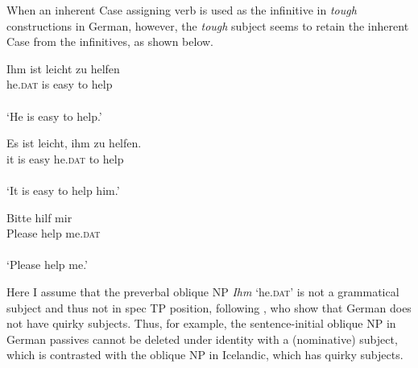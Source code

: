 \documentclass[output=paper,colorlinks,citecolor=brown,
]{langscibook}
\begin{document}
When an inherent Case assigning verb is used as the infinitive in \textit{tough} constructions in German, however, the \textit{tough} subject seems to retain the inherent Case from the infinitives, as shown below.

\begin{exe}
\ex \label{19ha}
\begin{xlist}
\ex \label{19aha}
\gll Ihm ist leicht zu helfen\\
he.\textsc{dat} is easy to help\\\\
‘He is easy to help.’

\ex \label{19bha}
\gll Es ist leicht, ihm zu helfen.\\
it is easy he.\textsc{dat} to help\\\\
‘It is easy to help him.’

\end{xlist}

\ex \label{20ha}
\gll Bitte   hilf   mir\\
Please help me.\textsc{dat}\\\\
 ‘Please help me.’
\end{exe}

Here I assume that the preverbal oblique NP \textit{Ihm} ‘he.\textsc{dat}’ is not a grammatical subject and thus not in spec TP position, following \citet{ZaenenThrainsson1985}, who show that German does not have quirky subjects. Thus, for example, the sentence-initial oblique NP in German passives cannot be deleted under identity with a (nominative) subject, which is contrasted with the oblique NP in Icelandic, which has quirky subjects.
\end{document}
